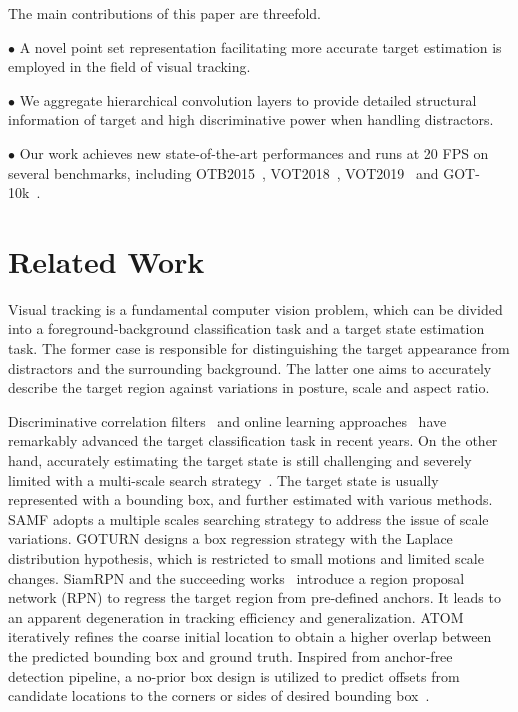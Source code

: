 \documentclass[runningheads]{llncs}
\begin{document}
The main contributions of this paper are threefold.

$\bullet$ A novel point set representation facilitating more accurate target
  estimation is employed in the field of visual tracking.

$\bullet$ We aggregate hierarchical convolution layers to provide detailed
  structural information of target and high discriminative
  power when handling distractors.

$\bullet$ Our work achieves new state-of-the-art performances and runs at 20 FPS
  on several benchmarks, including OTB2015~\cite{OTB2015}, VOT2018~\cite{VOT2018}, VOT2019~\cite{VOT2019} and
  GOT-10k~\cite{GOT-10k}.

\section{Related Work}
Visual tracking is a fundamental computer vision problem, which can be divided into a foreground-background classification task and a target state estimation task. The former case is responsible for distinguishing the target appearance from distractors and the surrounding background. The latter one aims to accurately describe the target region against variations in posture, scale and aspect ratio.

Discriminative correlation filters~\cite{srdcf,csrdcf,drt} and online learning approaches~\cite{atom,drol} have remarkably advanced the target classification task in recent years. On the other hand, accurately estimating the target state is still challenging and severely limited with a multi-scale search strategy~\cite{kcf,eco,siamfc,drt}. The target state is usually represented with a bounding box, and further estimated with various methods. SAMF\cite{li2014a} adopts a multiple scales searching strategy to address the issue of scale variations. GOTURN\cite{goturn} designs a box regression strategy with the Laplace distribution hypothesis, which is restricted to small motions and limited scale changes. SiamRPN and the succeeding works~\cite{siamrpn,siamrpn++,dasiamrpn} introduce a region proposal network (RPN) to regress the target region from pre-defined anchors. It leads to an apparent degeneration in tracking efficiency and generalization. ATOM~\cite{atom} iteratively refines the coarse initial location to obtain a higher overlap between the predicted bounding box and ground truth. Inspired from anchor-free detection pipeline, a no-prior box design is utilized to predict offsets from candidate locations to the corners or sides of desired bounding box~\cite{siamfc++,siamban,siamcar}.
\end{document}
